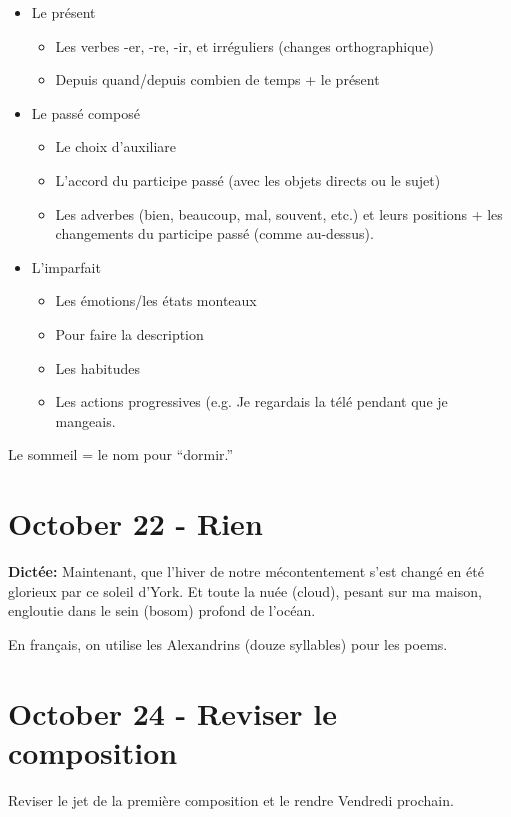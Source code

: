 \documentclass{report}
\begin{document}
\begin{itemize}
\item Le pr\'esent
\begin{itemize}
\item Les verbes -er, -re, -ir, et irr\'eguliers (changes orthographique)
\item Depuis quand/depuis combien de temps + le pr\'esent
\end{itemize}
\item Le pass\'e compos\'e
\begin{itemize}
\item Le choix d'auxiliare
\item L'accord du participe pass\'e (avec les objets directs ou le sujet)
\item Les adverbes (bien, beaucoup, mal, souvent, etc.) et leurs positions + les changements du participe pass\'e (comme au-dessus).
\end{itemize}
\item L'imparfait
\begin{itemize}
\item Les \'emotions/les \'etats monteaux 
\item Pour faire la description
\item Les habitudes
\item Les actions progressives (e.g. Je regardais la t\'el\'e pendant que je mangeais. 
\end{itemize}
\end{itemize}

Le sommeil = le nom pour ``dormir.''

\section{October 22 - Rien}

\textbf{Dict\'ee: } Maintenant, que l'hiver de notre m\'econtentement s'est chang\'e en \'et\'e glorieux par ce soleil d'York. Et toute la nu\'ee (cloud), pesant sur ma maison, engloutie dans le sein (bosom) profond de l'oc\'ean. 

En fran\c{c}ais, on utilise les Alexandrins (douze syllables) pour les poems. 

\section{October 24 - Reviser le composition}

Reviser le jet de la premi\`ere composition et le rendre Vendredi prochain. 
\end{document}
